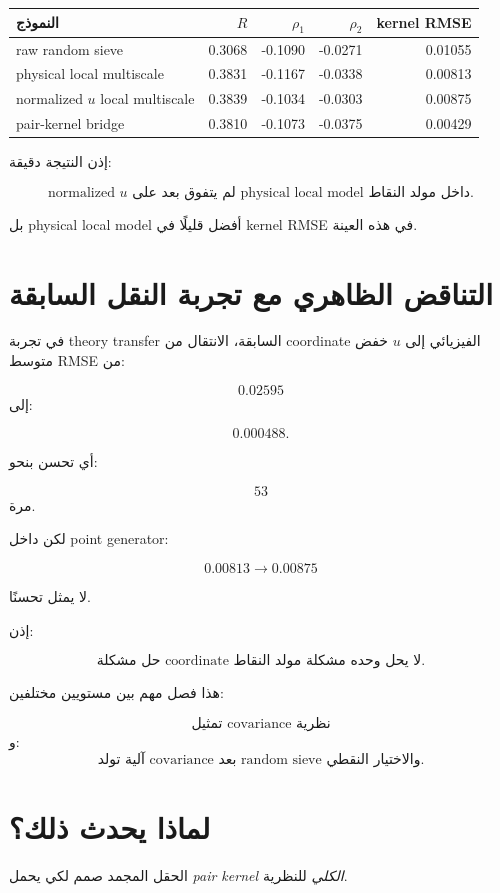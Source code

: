 \documentclass[12pt]{article}
\begin{document}
\begin{center}
\begin{tabular}{lrrrr}
\toprule
النموذج & \(R\) & \(\rho_1\) & \(\rho_2\) & kernel RMSE\\
\midrule
raw random sieve
&0.3068&-0.1090&-0.0271&0.01055\\
physical local multiscale
&0.3831&-0.1167&-0.0338&0.00813\\
normalized \(u\) local multiscale
&0.3839&-0.1034&-0.0303&0.00875\\
pair-kernel bridge
&0.3810&-0.1073&-0.0375&0.00429\\
\bottomrule
\end{tabular}
\end{center}

إذن النتيجة دقيقة:

\[
\boxed{
\text{normalized }u
\text{ لم يتفوق بعد على physical local model داخل مولد النقاط.}
}
\]

بل physical local model أفضل قليلًا في kernel RMSE في هذه العينة.

\section{التناقض الظاهري مع تجربة النقل السابقة}

في تجربة theory transfer السابقة، الانتقال من coordinate الفيزيائي إلى
\(u\) خفض متوسط RMSE من:

\[
0.02595
\]
إلى:

\[
0.000488.
\]

أي تحسن بنحو:

\[
53
\]
مرة.

لكن داخل point generator:

\[
0.00813
\longrightarrow
0.00875
\]

لا يمثل تحسنًا.

إذن:

\[
\boxed{
\text{حل مشكلة coordinate لا يحل وحده مشكلة مولد النقاط.}
}
\]

هذا فصل مهم بين مستويين مختلفين:

\[
\text{تمثيل covariance نظرية}
\]
و:
\[
\text{آلية تولد covariance بعد random sieve والاختيار النقطي.}
\]

\section{لماذا يحدث ذلك؟}

الحقل المجمد صمم لكي يحمل \emph{pair kernel الكلي} للنظرية.
\end{document}
